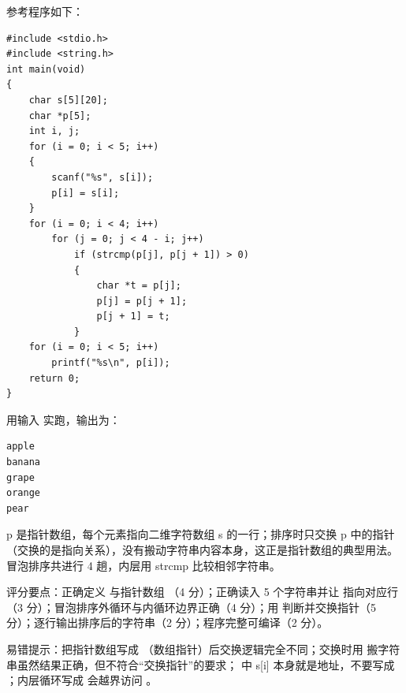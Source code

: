 \documentclass[a4paper,11pt]{article}
\begin{document}
\q 参考程序如下：
\begin{lstlisting}[language={[custom]C}]
#include <stdio.h>
#include <string.h>
int main(void)
{
    char s[5][20];
    char *p[5];
    int i, j;
    for (i = 0; i < 5; i++)
    {
        scanf("%s", s[i]);
        p[i] = s[i];
    }
    for (i = 0; i < 4; i++)
        for (j = 0; j < 4 - i; j++)
            if (strcmp(p[j], p[j + 1]) > 0)
            {
                char *t = p[j];
                p[j] = p[j + 1];
                p[j + 1] = t;
            }
    for (i = 0; i < 5; i++)
        printf("%s\n", p[i]);
    return 0;
}
\end{lstlisting}
\begin{analysis}用输入  实跑，输出为：
\begin{lstlisting}
apple
banana
grape
orange
pear
\end{lstlisting}
p 是指针数组，每个元素指向二维字符数组 s 的一行；排序时只交换 p 中的指针（交换的是指向关系），没有搬动字符串内容本身，这正是指针数组的典型用法。冒泡排序共进行 4 趟，内层用 strcmp 比较相邻字符串。\end{analysis}
\begin{analysis}评分要点：正确定义  与指针数组 （4 分）；正确读入 5 个字符串并让  指向对应行（3 分）；冒泡排序外循环与内循环边界正确（4 分）；用  判断并交换指针（5 分）；逐行输出排序后的字符串（2 分）；程序完整可编译（2 分）。\end{analysis}
\begin{analysis}易错提示：把指针数组写成 （数组指针）后交换逻辑完全不同；交换时用  搬字符串虽然结果正确，但不符合“交换指针”的要求； 中 s[i] 本身就是地址，不要写成 ；内层循环写成  会越界访问 。\end{analysis}
\end{document}
